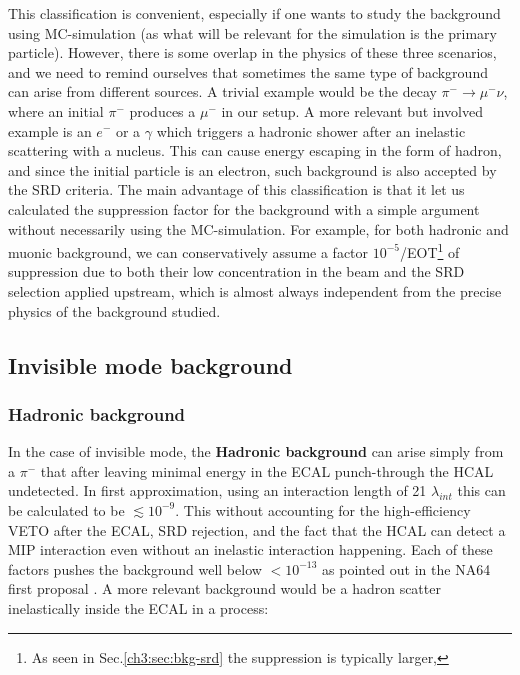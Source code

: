 This classification is convenient, especially if one wants to study the background using MC-simulation (as what will be relevant for the simulation is the primary particle). However, there is some overlap in the physics of these three scenarios, and we need to remind ourselves that sometimes the same type of background can arise from different sources. A trivial example would be the decay $\pi^- \rightarrow \mu^-\nu$, where an initial $\pi^-$ produces a $\mu^-$ in our setup. A more relevant but involved example is an $e^-$ or a $\gamma$ which triggers a hadronic shower after an inelastic scattering with a nucleus. This can cause energy escaping in the form of hadron, and since the initial particle is an electron, such background is also accepted by the SRD criteria. The main advantage of this classification is that it let us calculated the suppression factor for the background with a simple argument without necessarily using the MC-simulation. For example, for both hadronic and muonic background, we can conservatively assume a factor $10^{-5}$/EOT\footnote{As seen in Sec.\ref{ch3:sec:bkg-srd} the suppression is typically larger,} of suppression due to both their low concentration in the beam and the SRD selection applied upstream, which is almost always independent from the precise physics of the background studied.

\subsection{Invisible mode background}
\label{ch3:sec:bkg:inv}

\subsubsection{Hadronic background}
\label{ch3:sec:bkg:inv:hadr}


In the case of invisible mode, the \textbf{Hadronic background} can arise simply from a $\pi^-$ that after leaving minimal energy in the ECAL punch-through the HCAL undetected. In first approximation, using an interaction length of 21 $\lambda_{int}$ this can be calculated to be $\lesssim 10^{-9}$. This without accounting for the high-efficiency VETO after the ECAL, SRD rejection, and the fact that the HCAL can detect a MIP interaction even without an inelastic interaction happening. Each of these factors pushes the background well below $<10^{-13}$ as pointed out in the NA64 first proposal \cite{Andreas:2013lya}. A more relevant background would be a hadron scatter inelastically inside the ECAL in a process:

